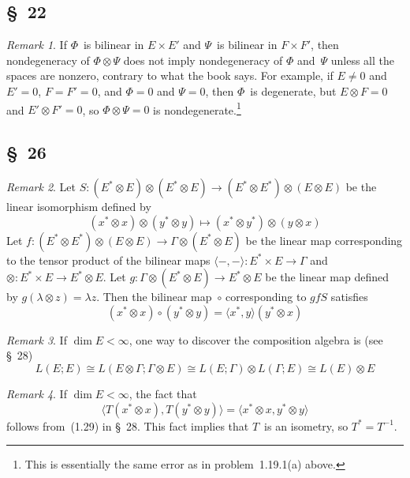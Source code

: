 \documentclass[letterpaper,12pt]{article}
\newcommand{\iso}{\cong}
\newcommand{\after}{\circ}
\newcommand{\cross}{\times}
\newcommand{\tprod}{\otimes}
\newcommand{\sprod}[2]{\langle#1,#2\rangle}
\theoremstyle{definition}
\theoremstyle{remark}
\newtheorem*{rmk}{Remark}
\begin{document}
\subsection*{\S~22}
\begin{rmk}
If \(\Phi\)~is bilinear in \(E\times E'\) and \(\Psi\)~is bilinear in \(F\times F'\), then nondegeneracy of \(\Phi\tprod\Psi\) does not imply nondegeneracy of \(\Phi\) and~\(\Psi\) unless all the spaces are nonzero, contrary to what the book says. For example, if \(E\ne 0\) and \(E'=0\), \(F=F'=0\), and \(\Phi=0\) and \(\Psi=0\), then \(\Phi\)~is degenerate, but \(E\tprod F=0\) and \(E'\tprod F'=0\), so \(\Phi\tprod\Psi=0\) is nondegenerate.\footnote{This is essentially the same error as in problem~1.19.1(a) above.}
\end{rmk}

\subsection*{\S~26}
\begin{rmk}
Let \(S:(E^*\tprod E)\tprod(E^*\tprod E)\to(E^*\tprod E^*)\tprod(E\tprod E)\) be the linear isomorphism defined by
\[(x^*\tprod x)\tprod(y^*\tprod y)\mapsto(x^*\tprod y^*)\tprod(y\tprod x)\]
Let \(f:(E^*\tprod E^*)\tprod(E\tprod E)\to\Gamma\tprod(E^*\tprod E)\) be the linear map corresponding to the tensor product of the bilinear maps \(\sprod{-}{-}:E^*\cross E\to\Gamma\) and \(\tprod:E^*\cross E\to E^*\tprod E\). Let \(g:\Gamma\tprod(E^*\tprod E)\to E^*\tprod E\) be the linear map defined by \(g(\lambda\tprod z)=\lambda z\). Then the bilinear map~\({\after}\) corresponding to \(gfS\) satisfies
\[(x^*\tprod x)\after(y^*\tprod y)=\sprod{x^*}{y}(y^*\tprod x)\]
\end{rmk}

\begin{rmk}
If \(\dim E<\infty\), one way to discover the composition algebra is (see \S~28)
\[L(E;E)\iso L(E\tprod\Gamma;\Gamma\tprod E)\iso L(E;\Gamma)\tprod L(\Gamma;E)\iso L(E)\tprod E\]
\end{rmk}

\begin{rmk}
If \(\dim E<\infty\), the fact that
\[\sprod{T(x^*\tprod x)}{T(y^*\tprod y)}=\sprod{x^*\tprod x}{y^*\tprod y}\]
follows from~(1.29) in \S~28. This fact implies that \(T\)~is an isometry, so \(T^*=T^{-1}\).
\end{rmk}
\end{document}
